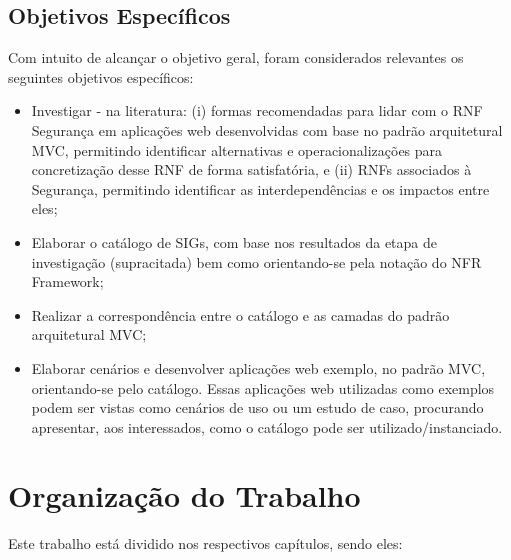 \subsection{Objetivos Específicos}

Com intuito de alcançar o objetivo geral, foram considerados relevantes os seguintes objetivos específicos:

\begin{itemize}
	
	\item Investigar - na literatura: (i) formas recomendadas para lidar com o RNF Segurança em aplicações web desenvolvidas com base no padrão arquitetural MVC, permitindo identificar alternativas e operacionalizações para concretização desse RNF de forma satisfatória, e (ii) RNFs associados à Segurança, permitindo identificar as interdependências e os impactos entre eles;
	
	\item Elaborar o catálogo de SIGs, com base nos resultados da etapa de investigação (supracitada) bem como orientando-se pela notação do NFR Framework;
	
	\item Realizar a correspondência entre o  catálogo e as camadas do padrão arquitetural MVC;
	
	
	\item Elaborar cenários e desenvolver aplicações web exemplo, no padrão MVC, orientando-se pelo catálogo. Essas aplicações web utilizadas como exemplos podem ser vistas como cenários de uso ou um estudo de caso, procurando apresentar, aos interessados, como o catálogo pode ser utilizado/instanciado. 
	
\end{itemize}

\section{Organização do Trabalho}

Este trabalho está dividido nos respectivos capítulos, sendo eles:
 
